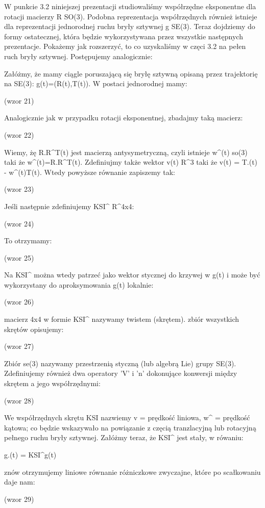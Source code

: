 W punkcie 3.2 niniejszej prezentacji studiowaliśmy współrzędne eksponentne dla rotacji macierzy R \in SO(3). Podobna reprezentacja współrzędnych również istnieje dla reprezentacji jednorodnej ruchu bryły sztywnej g \in SE(3). Teraz dojdziemy do formy ostatecznej, która będzie wykorzystywana przez wszystkie następnych prezentacje. Pokażemy jak rozszerzyć, to co uzyskaliśmy w częci 3.2 na pełen ruch bryły sztywnej. Postępujemy analogicznie:

Załóżmy, że mamy ciągle poruszającą się bryłę sztywną opisaną przez trajektorię na SE(3): g(t)=(R(t),T(t)). W postaci jednorodnej mamy:

(wzor 21)

Analogicznie jak w przypadku rotacji eksponentnej, zbadajmy taką macierz:

(wzor 22)

Wiemy, żę R.R^T(t) jest macierzą antysymetryczną, czyli istnieje w^(t) \in so(3) taki że w^(t)=R.R^T(t). Zdefiniujmy także wektor v(t) \in R^3 taki że v(t) = T.(t) - w^(t)T(t). Wtedy powyższe równanie zapiszemy tak:

(wzor 23)

Jeśli następnie zdefiniujemy KSI^ \in R^4x4:

(wzor 24)

To otrzymamy:

(wzor 25)

Na KSI^ można wtedy patrzeć jako wektor stycznej do krzywej w g(t) i może być wykorzystany do aproksymowania g(t) lokalnie:

(wzor 26)

macierz 4x4 w formie KSI^ nazywamy twistem (skrętem). zbiór wszystkich skrętów opisujemy:

(wzor 27)

Zbiór se(3) nazywamy przestrzenią styczną (lub algebrą Lie) grupy SE(3). Zdefiniujemy również dwa operatory 'V' i 'n' dokonujące konwersji między skrętem a jego współrzędnymi:

(wzor 28)

We współrzędnych skrętu KSI nazwiemy v = prędkość liniowa, w^ = prędkość kątowa; co będzie wskazywało na powiązanie z częcią tranzlacyjną lub rotacyjną pełnego ruchu bryły sztywnej. Załóżmy teraz, że KSI^ jest stały, w rówaniu:

g.(t) = KSI^g(t)

znów otrzymujemy liniowe równanie różniczkowe zwyczajne, które po scałkowaniu daje nam:

(wzor 29)

